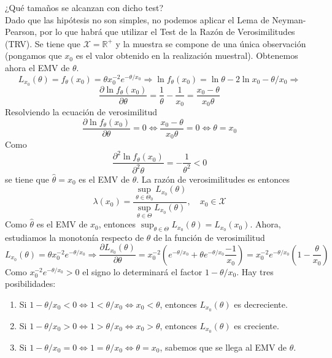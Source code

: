 \documentclass[12pt]{article}
\newcommand{\R}{\mathbb{R}}
\newcommand{\Rmas}{\R^{+}}
\newcommand{\X}{\mathcal{X}}
\begin{document}
\begin{ejercicio}[2,4 puntos]
\begin{enumerate}
            ¿Qué tamaños se alcanzan con dicho test? \\

            Dado que las hipótesis no son simples, no podemos aplicar el Lema de Neyman-Pearson, por lo que habrá que utilizar el Test
            de la Razón de Verosimilitudes (TRV). Se tiene que $\X = \Rmas$ y la muestra se compone de una única observación (pongamos que $x_0$
            es el valor obtenido en la realización muestral). Obtenemos ahora el EMV de $\theta$.
            $$L_{x_0}(\theta) = f_\theta(x_0) = \theta x_0^{-2} e^{-\theta/x_0} \Longrightarrow \ln f_\theta(x_0) = \ln \theta - 2 \ln x_0 - \theta/x_0 \Longrightarrow$$
            $$\dfrac{\partial \ln f_\theta(x_0)}{\partial \theta} = \dfrac{1}{\theta} - \dfrac{1}{x_0} = \dfrac{x_0 - \theta}{x_0 \theta}$$
            Resolviendo la ecuación de verosimilitud
            $$\dfrac{\partial \ln f_\theta(x_0)}{\partial \theta} = 0 \iff \dfrac{x_0 - \theta}{x_0 \theta} = 0 \iff \theta = x_0$$
            Como $$\dfrac{\partial^2 \ln f_\theta(x_0)}{\partial^2 \theta} = - \dfrac{1}{\theta^2} < 0$$
            se tiene que $\hat{\theta} = x_0$ es el EMV de $\theta$. 
            La razón de verosimilitudes es entonces
            $$\lambda(x_0) = \dfrac{\sup_{\theta \in \Theta_0} L_{x_0}(\theta)}{\sup_{\theta \in \Theta} L_{x_0}(\theta)}, \quad x_0 \in \X$$
            Como $\hat{\theta}$ es el EMV de $x_0$, entonces $\sup_{\theta \in \Theta} L_{x_0}(\theta) = L_{x_0}(x_0)$.
            Ahora, estudiamos la monotonía respecto de $\theta$ de la función de verosimilitud
            $$L_{x_0}(\theta) = \theta x_0^{-2} e^{-\theta/x_0} \Longrightarrow \dfrac{\partial L_{x_0}(\theta)}{\partial \theta} = 
            x_0^{-2} \left(e^{-\theta/x_0} + \theta e^{-\theta/x_0} \dfrac{-1}{x_0} \right) = x_0^{-2} e^{-\theta/x_0} \left(1 - \dfrac{\theta}{x_0} \right)$$
            Como $x_0^{-2} e^{- \theta/x_0} > 0$ el signo lo determinará el factor $1 - \theta / x_0$. Hay tres posibilidades:
            \begin{enumerate}
                \item Si $1 - \theta / x_0 < 0 \iff 1 < \theta/x_0 \iff x_0 < \theta$, entonces $L_{x_0}(\theta)$ es decreciente.
                \item Si $1 - \theta / x_0 > 0 \iff 1 > \theta/x_0 \iff x_0 > \theta$, entonces $L_{x_0}(\theta)$ es creciente.
                \item Si $1 - \theta / x_0 = 0 \iff 1 = \theta/x_0 \iff \theta = x_0$, sabemos que se llega al EMV de $\theta$.
            \end{enumerate}

\end{enumerate}
\end{ejercicio}
\end{document}

